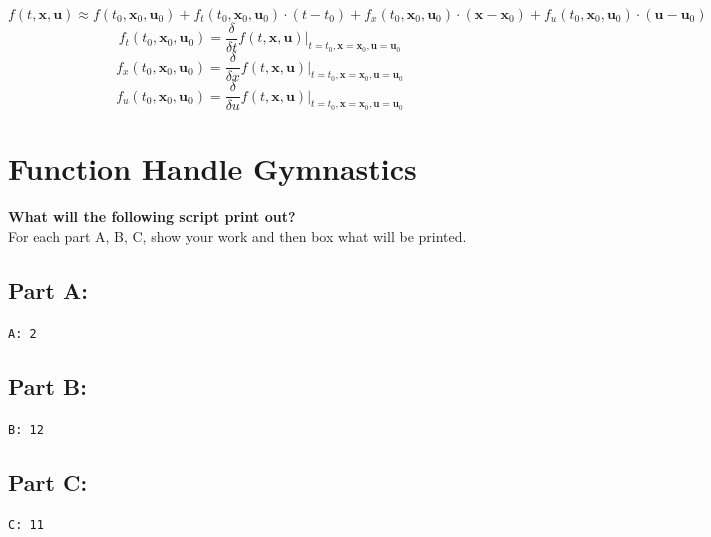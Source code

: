 \vspace{2em}
\begin{equation*}
  f(t, \bm{x}, \bm{u}) \approx
  f(t_0, \bm{x}_0, \bm{u}_0) +
  f_t(t_0, \bm{x}_0, \bm{u}_0) \cdot (t - t_0) +
  f_x(t_0, \bm{x}_0, \bm{u}_0) \cdot (\bm{x} - \bm{x}_0) +
  f_u(t_0, \bm{x}_0, \bm{u}_0) \cdot (\bm{u} - \bm{u}_0)
\end{equation*}
\vspace{1em}
\begin{equation*}
  f_t(t_0, \bm{x}_0, \bm{u}_0) = \frac{\delta}{\delta t} f(t, \bm{x}, \bm{u})
  \big|_{t = t_0, \bm{x} = \bm{x}_0, \bm{u} = \bm{u}_0}
\end{equation*}
\vspace{1em}
\begin{equation*}
  f_x(t_0, \bm{x}_0, \bm{u}_0) = \frac{\delta}{\delta x} f(t, \bm{x}, \bm{u})
  \big|_{t = t_0, \bm{x} = \bm{x}_0, \bm{u} = \bm{u}_0}
\end{equation*}
\vspace{1em}
\begin{equation*}
  f_u(t_0, \bm{x}_0, \bm{u}_0) = \frac{\delta}{\delta u} f(t, \bm{x}, \bm{u})
  \big|_{t = t_0, \bm{x} = \bm{x}_0, \bm{u} = \bm{u}_0}
\end{equation*}
\vspace{1em}


\pagebreak
\section{Function Handle Gymnastics}
\textbf{What will the following script print out?} \\
For each part A, B, C, show your work and then box what will be printed.


\subsection*{Part A:}
\texttt{A: 2}
\subsection*{Part B:}
\texttt{B: 12}
\subsection*{Part C: }
\texttt{C: 11}


